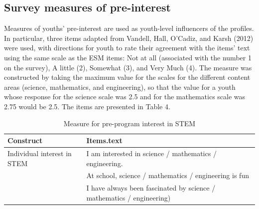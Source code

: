\documentclass[]{msu-thesis}
\theoremstyle{definition}
\theoremstyle{definition}
\theoremstyle{definition}
\theoremstyle{remark}
\begin{document}
\begin{table}

\caption{\label{tab:unnamed-chunk-4}ESM measures for profiles of engagement and its conditions}
\centering
{}
\end{table}

\subsection{Survey measures of
pre-interest}\label{survey-measures-of-pre-interest}

Measures of youths' pre-interest are used as youth-level influencers of
the profiles. In particular, three items adapted from Vandell, Hall,
O'Cadiz, and Karsh (2012) were used, with directions for youth to rate
their agreement with the items' text using the same scale as the ESM
items: Not at all (associated with the number 1 on the survey), A little
(2), Somewhat (3), and Very Much (4). The measure was constructed by
taking the maximum value for the scales for the different content areas
(science, mathematics, and engineering), so that the value for a youth
whose response for the science scale was 2.5 and for the mathematics
scale was 2.75 would be 2.5. The items are presented in Table 4.

\begin{table}

\caption{\label{tab:unnamed-chunk-5}Measure for pre-program interest in STEM}
\centering
\begin{tabular}[t]{ll}
\toprule
Construct & Items.text\\
\midrule
Individual interest in STEM & I am interested in science / mathematics / engineering.\\
 & At school, science / mathematics / engineering is fun\\
 & I have always been fascinated by science / mathematics / engineering)\\
\bottomrule
\end{tabular}
\end{table}
\end{document}
